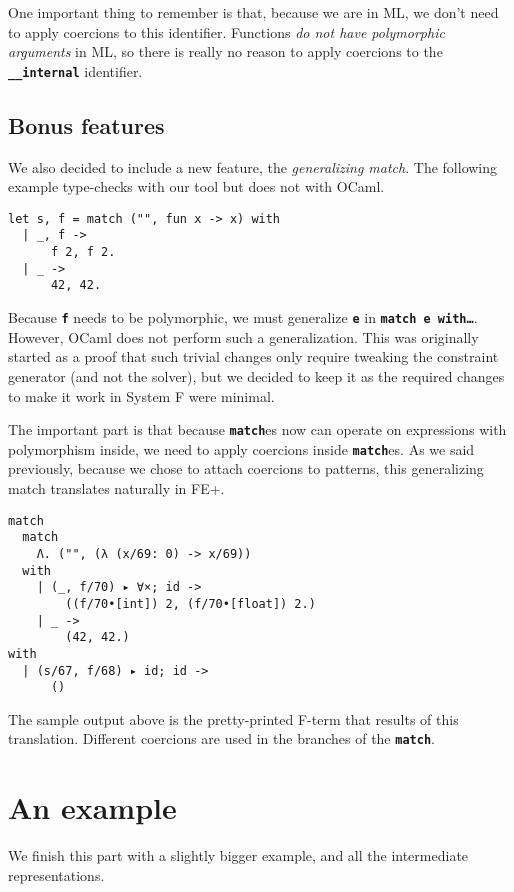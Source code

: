 \documentclass[10pt,a4paper,twoside,titlepage,twocolumn]{article}
\newcommand{\code}[1]{\textbf{\texttt{#1}}}
\begin{document}
One important thing to remember is that, because we are in ML, we don't need to
apply coercions to this identifier. Functions \emph{do not have polymorphic
arguments} in ML, so there is really no reason to apply coercions to the
\code{\_\_internal} identifier.

\subsection{Bonus features}

We also decided to include a new feature, the \emph{generalizing match}. The
following example type-checks with our tool but does not with OCaml.

\begin{verbatim}
let s, f = match ("", fun x -> x) with
  | _, f ->
      f 2, f 2.
  | _ ->
      42, 42.
\end{verbatim}

Because \code{f} needs to be polymorphic, we must generalize \code{e} in
\code{match e with\dots}. However, OCaml does not perform such a generalization.
This was originally started as a proof that such trivial changes only require
tweaking the constraint generator (and not the solver), but we decided to keep
it as the required changes to make it work in System F were minimal.

The important part is that because \code{match}es now can operate on
expressions with polymorphism inside, we need to apply coercions inside
\code{match}es. As we said previously, because we chose to attach coercions to
patterns, this generalizing match translates naturally in FE+.

\begin{verbatim}
match
  match
    Λ. ("", (λ (x/69: 0) -> x/69))
  with
    | (_, f/70) ▸ ∀×; id ->
        ((f/70•[int]) 2, (f/70•[float]) 2.)
    | _ ->
        (42, 42.)
with
  | (s/67, f/68) ▸ id; id ->
      ()
\end{verbatim}

The sample output above is the pretty-printed F-term that results of this
translation. Different coercions are used in the branches of the \code{match}.

\section{An example}

We finish this part with a slightly bigger example, and all the intermediate
representations.
\end{document}
